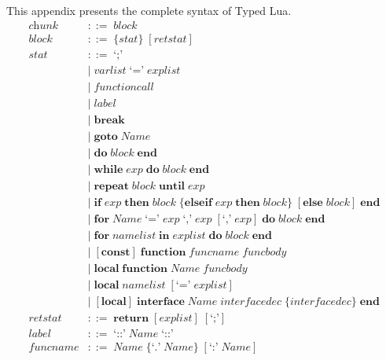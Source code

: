 This appendix presents the complete syntax of Typed Lua.
\allowdisplaybreaks
\begin{align*}
\textit{chunk} & ::= \; \textit{block}\\
\textit{block} & ::= \; \{\textit{stat}\} \; [\textit{retstat}]\\
\textit{stat} & ::= \; \texttt{`;'}\\
& | \; \textit{varlist} \; \texttt{`='} \; \textit{explist}\\
& | \; \textit{functioncall}\\
& | \; \textit{label}\\
& | \; \textbf{break}\\ 
& | \; \textbf{goto} \; \textit{Name}\\
& | \; \textbf{do} \; \textit{block} \; \textbf{end}\\
& | \; \textbf{while} \; \textit{exp} \; \textbf{do} \; \textit{block} \; \textbf{end}\\
& | \; \textbf{repeat} \; \textit{block} \; \textbf{until} \; \textit{exp}\\
& | \; \textbf{if} \; \textit{exp} \; \textbf{then} \; \textit{block} \;
  \{\textbf{elseif} \; \textit{exp} \; \textbf{then} \; \textit{block}\} \;
  [\textbf{else} \; \textit{block}] \; \textbf{end}\\ 
& | \; \textbf{for} \; \textit{Name} \; \texttt{`='} \; \textit{exp} \;
  \texttt{`,'} \; \textit{exp} \; [\texttt{`,'} \; \textit{exp}] \;
  \textbf{do} \; \textit{block} \; \textbf{end}\\
& | \; \textbf{for} \; \textit{namelist} \; \textbf{in} \; \textit{explist} \;
  \textbf{do} \; \textit{block} \; \textbf{end}\\
& | \; [\textbf{const}] \; \textbf{function} \; \textit{funcname} \; \textit{funcbody}\\
& | \; \textbf{local} \; \textbf{function} \; \textit{Name} \; \textit{funcbody}\\
& | \; \textbf{local} \; \textit{namelist} \; [\texttt{`='} \; \textit{explist}]\\
& | \; [\textbf{local}] \; \textbf{interface} \; \textit{Name} \; \textit{interfacedec} \;
  \{\textit{interfacedec}\} \; \textbf{end}\\
\textit{retstat} & ::= \; \textbf{return} \; [\textit{explist}] \; [\texttt{`;'}]\\
\textit{label} & ::= \; \texttt{`::'} \; \textit{Name} \; \texttt{`::'}\\
\textit{funcname} & ::= \; \textit{Name} \; \{\texttt{`.'} \; \textit{Name}\} \; [\texttt{`:'} \; \textit{Name}]\\

\end{align*}
